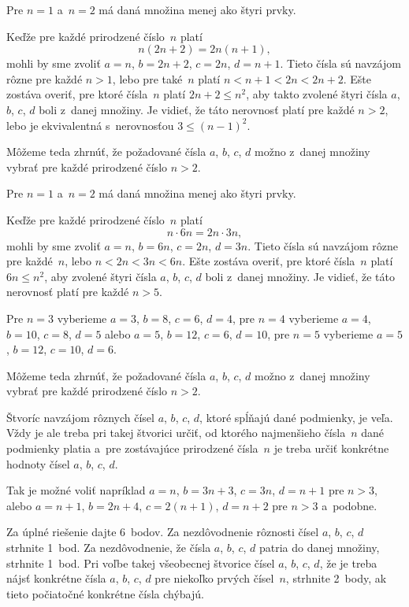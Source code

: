 {%
Pre $n=1$ a~$n=2$ má daná množina menej ako štyri prvky.

Keďže pre každé prirodzené číslo~$n$ platí
$$
n(2n+2)=2n(n+1),
$$
mohli by sme zvoliť $a=n$, $b=2n+2$, $c=2n$, $d=n+1$. Tieto čísla
sú navzájom rôzne pre každé $n>1$, lebo pre také~$n$ platí
$n<n+1<2n<2n+2$. Ešte zostáva overiť, pre ktoré čísla~$n$ platí
$2n+2\leq n^2$, aby takto zvolené štyri čísla $a$, $b$, $c$, $d$
boli z~danej množiny. Je vidieť, že táto nerovnosť platí
pre každé $n>2$, lebo je ekvivalentná s~nerovnosťou $3\leq
(n-1)^2$.

Môžeme teda zhrnúť, že požadované čísla $a$, $b$, $c$, $d$ možno
z~danej množiny vybrať pre každé prirodzené číslo $n>2$.

\ineriesenie
Pre $n=1$ a~$n=2$ má daná množina menej ako štyri prvky.

Keďže pre každé prirodzené číslo~$n$ platí
$$
n\cdot6n=2n\cdot3n,
$$
mohli by sme zvoliť $a=n$, $b=6n$, $c=2n$, $d=3n$. Tieto čísla
sú navzájom rôzne pre každé~$n$, lebo $n<2n<3n<6n$. Ešte
zostáva overiť, pre ktoré čísla~$n$ platí $6n\leq
n^2$, aby zvolené štyri čísla $a$, $b$, $c$, $d$ boli z~danej
množiny. Je vidieť, že táto nerovnosť platí pre
každé $n>5$.

Pre $n=3$ vyberieme $a=3$, $b=8$, $c=6$, $d=4$, pre $n=4$ vyberieme
$a=4$, $b=10$, $c=8$, $d=5$ alebo $a=5$, $b=12$, $c=6$, $d=10$,
pre $n=5$ vyberieme $a=5$, $b=12$, $c=10$, $d=6$.

Môžeme teda zhrnúť, že požadované čísla $a$, $b$, $c$, $d$ možno
z~danej množiny vybrať pre každé prirodzené číslo $n>2$.

\poznamka
Štvoríc navzájom rôznych čísel $a$, $b$, $c$, $d$, ktoré spĺňajú
dané podmienky, je veľa. Vždy je ale treba pri takej štvorici
určiť, od ktorého najmenšieho čísla~$n$ dané podmienky platia a~pre
zostávajúce prirodzené čísla~$n$ je treba určiť konkrétne hodnoty čísel
$a$, $b$, $c$, $d$.

Tak je možné voliť napríklad $a=n$, $b=3n+3$, $c=3n$, $d=n+1$ pre
$n>3$, alebo $a=n+1$, $b=2n+4$, $c=2(n+1)$, $d=n+2$ pre $n>3$ a~podobne.

\nobreak\medskip\petit\noindent
Za úplné riešenie dajte 6~bodov. Za nezdôvodnenie rôznosti čísel
$a$, $b$, $c$, $d$ strhnite 1~bod. Za nezdôvodnenie, že čísla
$a$, $b$, $c$, $d$ patria do danej množiny, strhnite 1~bod. Pri
voľbe takej všeobecnej štvorice čísel $a$, $b$, $c$, $d$, že je
treba nájsť konkrétne čísla $a$, $b$, $c$, $d$ pre niekoľko
prvých čísel~$n$, strhnite 2~body, ak tieto počiatočné
konkrétne čísla chýbajú.

\endpetit
\bigbreak}

